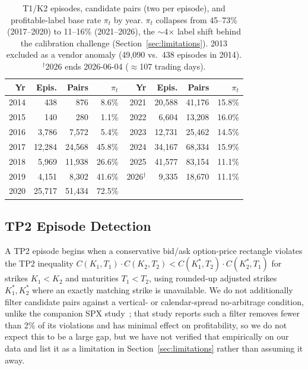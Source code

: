 \documentclass[sigconf,review,anonymous]{acmart}
\begin{document}
\begin{table}[t]
\centering
\footnotesize
\begin{tabular}{rrrr@{\hskip 1.4em}rrrr}
\toprule
Yr & Epis. & Pairs & $\pi_t$ & Yr & Epis. & Pairs & $\pi_t$ \\
\midrule
2014 & 438 & 876 & 8.6\% & 2021 & 20{,}588 & 41{,}176 & 15.8\% \\
2015 & 140 & 280 & 1.1\% & 2022 & 6{,}604 & 13{,}208 & 16.0\% \\
2016 & 3{,}786 & 7{,}572 & 5.4\% & 2023 & 12{,}731 & 25{,}462 & 14.5\% \\
2017 & 12{,}284 & 24{,}568 & 45.8\% & 2024 & 34{,}167 & 68{,}334 & 15.9\% \\
2018 & 5{,}969 & 11{,}938 & 26.6\% & 2025 & 41{,}577 & 83{,}154 & 11.1\% \\
2019 & 4{,}151 & 8{,}302 & 41.6\% & 2026$^\dagger$ & 9{,}335 & 18{,}670 & 11.1\% \\
2020 & 25{,}717 & 51{,}434 & 72.5\% & & & & \\
\bottomrule
\end{tabular}
\caption{T1/K2 episodes, candidate pairs (two per episode), and profitable-label base rate $\pi_t$ by year. $\pi_t$ collapses from 45--73\% (2017--2020) to 11--16\% (2021--2026), the $\sim$4$\times$ label shift behind the calibration challenge (Section~\ref{sec:limitations}). 2013 excluded as a vendor anomaly (49{,}090 vs.\ 438 episodes in 2014). $^\dagger$2026 ends 2026-06-04 ($\approx$107 trading days).}
\label{tab:peryear}
\end{table}

\subsection{TP2 Episode Detection}
A TP2 episode begins when a conservative bid/ask option-price rectangle violates the TP2 inequality $C(K_1,T_1)\cdot C(K_2,T_2) < C(K_1^{\ast},T_2)\cdot C(K_2^{\ast},T_1)$ for strikes $K_1 < K_2$ and maturities $T_1 < T_2$, using rounded-up adjusted strikes $K_1^{\ast}, K_2^{\ast}$ where an exactly matching strike is unavailable. We do not additionally filter candidate pairs against a vertical- or calendar-spread no-arbitrage condition, unlike the companion SPX study~\cite{glasserman2025tp2}; that study reports such a filter removes fewer than 2\% of its violations and has minimal effect on profitability, so we do not expect this to be a large gap, but we have not verified that empirically on our data and list it as a limitation in Section~\ref{sec:limitations} rather than assuming it away.
\end{document}
